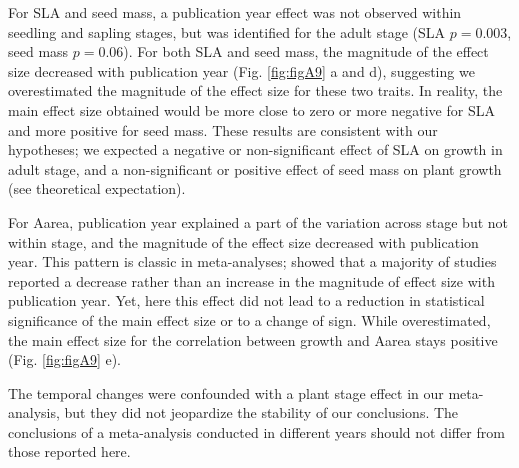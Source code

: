 \documentclass[a4paper,11pt]{article}
\begin{document}
\begin{appendices}
For SLA and seed mass, a publication year effect was not observed within seedling and sapling stages, but was identified for the adult stage (SLA $p = 0.003$, seed mass $p = 0.06$). For both SLA and seed mass, the magnitude of the effect size decreased with publication year (Fig. \ref{fig:figA9} a and d), suggesting we overestimated the magnitude of the effect size for these two traits. In reality, the main effect size obtained would be more close to zero or more negative for SLA and more positive for seed mass. These results are consistent with our hypotheses; we expected a negative or non-significant effect of SLA on growth in adult stage, and a non-significant or positive effect of seed mass on plant growth (see theoretical expectation).

For Aarea, publication year explained a part of the variation across stage but not within stage, and the magnitude of the effect size decreased with publication year. This pattern is classic in meta-analyses; \citealt{Koricheva:2013hy} showed that a majority of studies reported a decrease rather than an increase in the magnitude of effect size with publication year. Yet, here this effect did not lead to a reduction in statistical significance of the main effect size or to a change of sign. While overestimated, the main effect size for the correlation between growth and Aarea stays positive (Fig. \ref{fig:figA9} e).  

The temporal changes were confounded with a plant stage effect in our meta-analysis, but they did not jeopardize the stability of our conclusions. The conclusions of a meta-analysis conducted in different years should not differ from those reported here.


\end{appendices}
\end{document}

